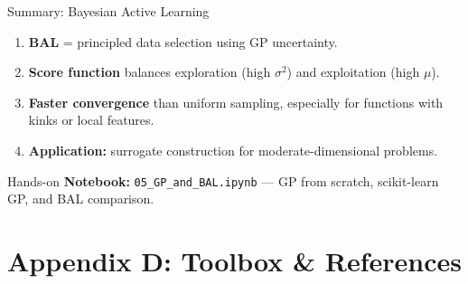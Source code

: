\documentclass[aspectratio=169,11pt]{beamer}
\begin{document}
\begin{frame}{Summary: Bayesian Active Learning}
\begin{enumerate}
  \item \textbf{BAL} = principled data selection using GP uncertainty.
  \item \textbf{Score function} balances exploration (high $\sigma^2$) and exploitation (high $\mu$).
  \item \textbf{Faster convergence} than uniform sampling, especially for functions with kinks or local features.
  \item \textbf{Application:} surrogate construction for moderate-dimensional problems.
\end{enumerate}

\vspace{0.3cm}
\begin{block}{Hands-on}
\textbf{Notebook:} \texttt{05\_GP\_and\_BAL.ipynb} --- GP from scratch, scikit-learn GP, and BAL comparison.
\end{block}
\end{frame}
\section{Appendix D: Toolbox \& References}
\end{document}
